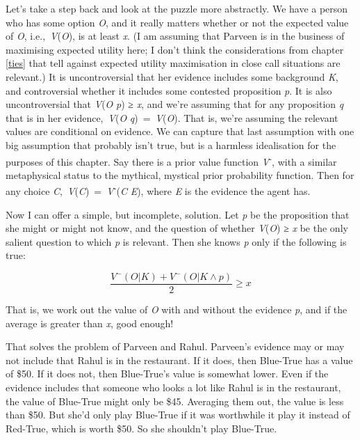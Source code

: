 \documentclass[
  11pt,
]{book}
\begin{document}
Let's take a step back and look at the puzzle more abstractly. We have a person who has some option \emph{O}, and it really matters whether or not the expected value of \emph{O}, i.e.,~\emph{V}(\emph{O}), is at least \emph{x}. (I am assuming that Parveen is in the business of maximising expected utility here; I don't think the considerations from chapter \ref{ties} that tell against expected utility maximisation in close call situations are relevant.) It is uncontroversial that her evidence includes some background \emph{K}, and controversial whether it includes some contested proposition \emph{p}. It is also uncontroversial that \emph{V}(\emph{O} \textbar{} \emph{p}) ≥ \emph{x}, and we're assuming that for any proposition \emph{q} that is in her evidence,~\emph{V}(\emph{O} \textbar{} \emph{q})~=~\emph{V}(\emph{O}). That is, we're assuming the relevant values are conditional on evidence. We can capture that last assumption with one big assumption that probably isn't true, but is a harmless idealisation for the purposes of this chapter. Say there is a prior value function \emph{V}\textsuperscript{-}, with a similar metaphysical status to the mythical, mystical prior probability function. Then for any choice \emph{C},~\emph{V}(\emph{C})~=~\emph{V}\textsuperscript{-}(\emph{C} \textbar{} \emph{E}), where \emph{E} is the evidence the agent has.

Now I can offer a simple, but incomplete, solution. Let \emph{p} be the proposition that she might or might not know, and the question of whether \emph{V}(\emph{O}) ≥ \emph{x} be the only salient question to which \emph{p} is relevant. Then she knows \emph{p} only if the following is true:

\[
\frac{V^-(O | K) + V^-(O | K \wedge p)}{2} \geq x
\]

That is, we work out the value of \emph{O} with and without the evidence \emph{p}, and if the average is greater than \emph{x}, good enough!

That solves the problem of Parveen and Rahul. Parveen's evidence may or may not include that Rahul is in the restaurant. If it does, then Blue-True has a value of \$50. If it does not, then Blue-True's value is somewhat lower. Even if the evidence includes that someone who looks a lot like Rahul is in the restaurant, the value of Blue-True might only be \$45. Averaging them out, the value is less than \$50. But she'd only play Blue-True if it was worthwhile it play it instead of Red-True, which is worth \$50. So she shouldn't play Blue-True.
\end{document}
